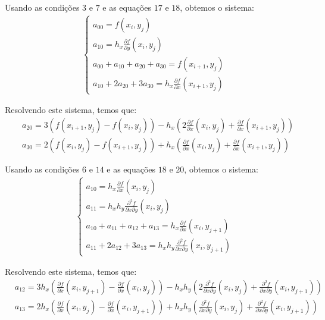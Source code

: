 \documentclass[a4paper, 12pt]{article}
\begin{document}
Usando as condições $3$ e $7$ e as equações $17$ e $18$, obtemos o sistema:
\begin{align*}
    \begin{cases}
        a_{00} = f(x_{i}, y_{j}) \\
        a_{10} = h_x \frac{\partial f}{\partial y}(x_i, y_j) \\
        a_{00} + a_{10} + a_{20} + a_{30} = f(x_{i+1}, y_j) \\
        a_{10} + 2a_{20} + 3a_{30} = h_x \frac{\partial f}{\partial x}(x_{i+1}, y_j) 
    \end{cases}
\end{align*}

Resolvendo este sistema, temos que:
\begin{align}
    &a_{20} = 3(f(x_{i+1}, y_j) - f(x_i, y_j)) - 
    h_x \left(2\frac{\partial f}{\partial x}(x_i, y_j) + \frac{\partial f}{\partial x}(x_{i+1},y_j)\right)
    \tag{23} \\
    &a_{30} = 2(f(x_i, y_j) - f(x_{i+1}, y_j)) + 
    h_x \left(\frac{\partial f}{\partial x}(x_i, y_j) + \frac{\partial f}{\partial x}(x_{i+1},y_j)\right)
    \tag{24}
\end{align}

Usando as condições $6$ e $14$ e as equações $18$ e $20$, obtemos o sistema:
\begin{align*}
    \begin{cases}
        a_{10} = h_{x} \frac{\partial f}{\partial x}(x_{i}, y_{j}) \\
        a_{11} = h_x h_y \frac{\partial^2 f}{\partial x \partial y}(x_i, y_j) \\
        a_{10} + a_{11} + a_{12} + a_{13} = h_x \frac{\partial f}{\partial x}(x_i, y_{j+1}) \\
        a_{11} + 2a_{12} + 3a_{13} = h_x h_y \frac{\partial^2 f}{\partial x \partial y}(x_i, y_{j+1}) 
    \end{cases}
\end{align*}

Resolvendo este sistema, temos que:
\begin{align}
    &a_{12} = 3h_x\left(\frac{\partial f}{\partial x}(x_i, y_{j+1}) - \frac{\partial f}{\partial x}(x_{i}, y_{j})\right) - 
    h_x h_y \left(2\frac{\partial^2 f}{\partial x \partial y}(x_i, y_j) + \frac{\partial^2 f}{\partial x \partial y}(x_i, y_{j+1}) \right)
    \tag{25} \\
    &a_{13} = 2h_x\left(\frac{\partial f}{\partial x}(x_{i}, y_{j}) - \frac{\partial f}{\partial x}(x_i, y_{j+1})\right) + 
    h_x h_y\left(\frac{\partial^2 f}{\partial x \partial y}(x_i, y_j) + \frac{\partial^2 f}{\partial x \partial y}(x_i, y_{j+1})\right)
    \tag{26}
\end{align}
\end{document}

